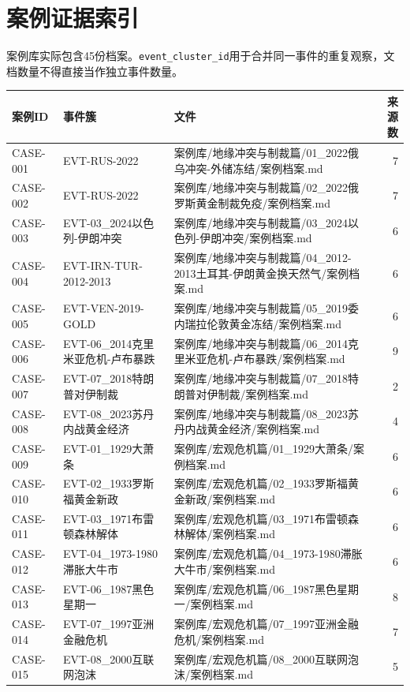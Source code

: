 \documentclass[UTF8,openany,oneside,11pt]{ctexbook}
\begin{document}
\chapter{案例证据索引}
案例库实际包含45份档案。\texttt{event\_cluster\_id}用于合并同一事件的重复观察，文档数量不得直接当作独立事件数量。
\footnotesize
\begin{longtable}{L{1.5cm}L{3cm}L{10cm}r}\toprule
案例ID & 事件簇 & 文件 & 来源数\\\midrule\endhead
CASE-001 & EVT-RUS-2022 & 案例库/地缘冲突与制裁篇/01\_2022俄乌冲突-外储冻结/案例档案.md & 7 \\
CASE-002 & EVT-RUS-2022 & 案例库/地缘冲突与制裁篇/02\_2022俄罗斯黄金制裁免疫/案例档案.md & 7 \\
CASE-003 & EVT-03\_2024以色列-伊朗冲突 & 案例库/地缘冲突与制裁篇/03\_2024以色列-伊朗冲突/案例档案.md & 6 \\
CASE-004 & EVT-IRN-TUR-2012-2013 & 案例库/地缘冲突与制裁篇/04\_2012-2013土耳其-伊朗黄金换天然气/案例档案.md & 6 \\
CASE-005 & EVT-VEN-2019-GOLD & 案例库/地缘冲突与制裁篇/05\_2019委内瑞拉伦敦黄金冻结/案例档案.md & 6 \\
CASE-006 & EVT-06\_2014克里米亚危机-卢布暴跌 & 案例库/地缘冲突与制裁篇/06\_2014克里米亚危机-卢布暴跌/案例档案.md & 9 \\
CASE-007 & EVT-07\_2018特朗普对伊制裁 & 案例库/地缘冲突与制裁篇/07\_2018特朗普对伊制裁/案例档案.md & 2 \\
CASE-008 & EVT-08\_2023苏丹内战黄金经济 & 案例库/地缘冲突与制裁篇/08\_2023苏丹内战黄金经济/案例档案.md & 4 \\
CASE-009 & EVT-01\_1929大萧条 & 案例库/宏观危机篇/01\_1929大萧条/案例档案.md & 6 \\
CASE-010 & EVT-02\_1933罗斯福黄金新政 & 案例库/宏观危机篇/02\_1933罗斯福黄金新政/案例档案.md & 6 \\
CASE-011 & EVT-03\_1971布雷顿森林解体 & 案例库/宏观危机篇/03\_1971布雷顿森林解体/案例档案.md & 6 \\
CASE-012 & EVT-04\_1973-1980滞胀大牛市 & 案例库/宏观危机篇/04\_1973-1980滞胀大牛市/案例档案.md & 6 \\
CASE-013 & EVT-06\_1987黑色星期一 & 案例库/宏观危机篇/06\_1987黑色星期一/案例档案.md & 8 \\
CASE-014 & EVT-07\_1997亚洲金融危机 & 案例库/宏观危机篇/07\_1997亚洲金融危机/案例档案.md & 7 \\
CASE-015 & EVT-08\_2000互联网泡沫 & 案例库/宏观危机篇/08\_2000互联网泡沫/案例档案.md & 5 \\

\end{longtable}
\end{document}
